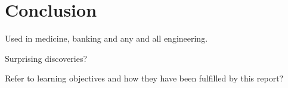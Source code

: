 \chapter{Conclusion} \label{ch:conclussion}

Used in medicine, banking and any and all engineering.

Surprising discoveries?

Refer to learning objectives and how they have been fulfilled by this report?
